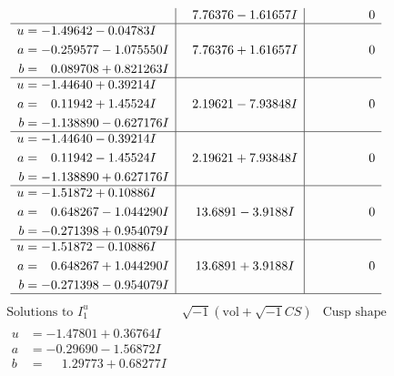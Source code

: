 \documentclass[1p]{elsarticle_modified}
\theoremstyle{definition}
\newcommand{\I}{\sqrt{-1}}
\begin{document}
$$\begin{array}{c|c|c}
 & \phantom{-}7.76376 - 1.61657 I & \phantom{-0.000000 } 0 \\ \hline\begin{aligned}
u &= -1.49642 - 0.04783 I \\
a &= -0.259577 - 1.075550 I \\
b &= \phantom{-}0.089708 + 0.821263 I\end{aligned}
 & \phantom{-}7.76376 + 1.61657 I & \phantom{-0.000000 } 0 \\ \hline\begin{aligned}
u &= -1.44640 + 0.39214 I \\
a &= \phantom{-}0.11942 + 1.45524 I \\
b &= -1.138890 - 0.627176 I\end{aligned}
 & \phantom{-}2.19621 - 7.93848 I & \phantom{-0.000000 } 0 \\ \hline\begin{aligned}
u &= -1.44640 - 0.39214 I \\
a &= \phantom{-}0.11942 - 1.45524 I \\
b &= -1.138890 + 0.627176 I\end{aligned}
 & \phantom{-}2.19621 + 7.93848 I & \phantom{-0.000000 } 0 \\ \hline\begin{aligned}
u &= -1.51872 + 0.10886 I \\
a &= \phantom{-}0.648267 - 1.044290 I \\
b &= -0.271398 + 0.954079 I\end{aligned}
 & \phantom{-}13.6891 - 3.9188 I & \phantom{-0.000000 } 0 \\ \hline\begin{aligned}
u &= -1.51872 - 0.10886 I \\
a &= \phantom{-}0.648267 + 1.044290 I \\
b &= -0.271398 - 0.954079 I\end{aligned}
 & \phantom{-}13.6891 + 3.9188 I & \phantom{-0.000000 } 0\\
 \hline 
 \end{array}$$\newpage$$\begin{array}{c|c|c}  
\text{Solutions to }I^u_{1}& \I (\text{vol} + \sqrt{-1}CS) & \text{Cusp shape}\\
 \hline 
\begin{aligned}
u &= -1.47801 + 0.36764 I \\
a &= -0.29690 - 1.56872 I \\
b &= \phantom{-}1.29773 + 0.68277 I\end{aligned}

\end{array}$$
\end{document}
